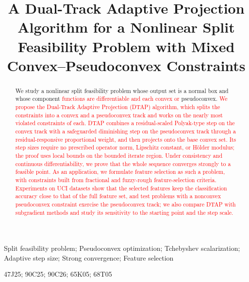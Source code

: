 \documentclass[]{interact}
\theoremstyle{plain}
\theoremstyle{definition}
\theoremstyle{remark}
\begin{document}
\title{A Dual-Track Adaptive Projection Algorithm for a Nonlinear Split Feasibility Problem with Mixed Convex--Pseudoconvex Constraints}

\author{
}

\maketitle

\begin{abstract}
We study a nonlinear split feasibility problem whose output set is a normal box and whose component \leavevmode\textcolor{red}{functions are differentiable and each convex or} pseudoconvex. \leavevmode\textcolor{red}{We propose the Dual-Track Adaptive Projection (DTAP) algorithm, which splits the constraints into a convex and a pseudoconvex track and works on the nearly most violated constraints of each. DTAP combines a residual-scaled Polyak-type step on the convex track with a safeguarded diminishing step on the pseudoconvex track through a residual-responsive proportional weight, and then projects onto the base convex set. Its step sizes require no prescribed operator norm, Lipschitz constant, or H\"older modulus; the proof uses local bounds on the bounded iterate region. Under consistency and continuous differentiability, we prove that the whole sequence converges strongly to a feasible point. As an application, we formulate feature selection as such a problem, with constraints built from fractional and fuzzy-rough feature-selection criteria. Experiments on UCI datasets show that the selected features keep the classification accuracy close to that of the full feature set, and test problems with a nonconvex pseudoconvex constraint exercise the pseudoconvex track; we also compare DTAP with subgradient methods and study its sensitivity to the starting point and the step scale.}
\end{abstract}

\begin{keywords}
Split feasibility problem; Pseudoconvex optimization; Tchebyshev scalarization; Adaptive step size; Strong convergence; Feature selection
\end{keywords}
\begin{amscode}
47J25; 90C25; 90C26; 65K05; 68T05
\end{amscode}
\end{document}

